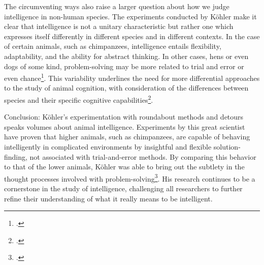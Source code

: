 \documentclass[12pt]{article}
\begin{document}
The circumventing ways also raise a larger question about how we judge intelligence in non-human species. The experiments conducted by Köhler make it clear that intelligence is not a unitary characteristic but rather one which expresses itself differently in different species and in different contexts. In the case of certain animals, such as chimpanzees, intelligence entails flexibility, adaptability, and the ability for abstract thinking. In other cases, hens or even dogs of some kind, problem-solving may be more related to trial and error or even chance\footcite{thorndike1898animal}. This variability underlines the need for more differential approaches to the study of animal cognition, with consideration of the differences between species and their specific cognitive capabilities\footcite{morgan1894animal}.

Conclusion: Köhler's experimentation with roundabout methods and detours speaks volumes about animal intelligence. Experiments by this great scientist have proven that higher animals, such as chimpanzees, are capable of behaving intelligently in complicated environments by insightful and flexible solution-finding, not associated with trial-and-error methods. By comparing this behavior to that of the lower animals, Köhler was able to bring out the subtlety in the thought processes involved with problem-solving\footcite{koehler1921mentality}. His research continues to be a cornerstone in the study of intelligence, challenging all researchers to further refine their understanding of what it really means to be intelligent.

\newpage

\printbibliography
\end{document}
